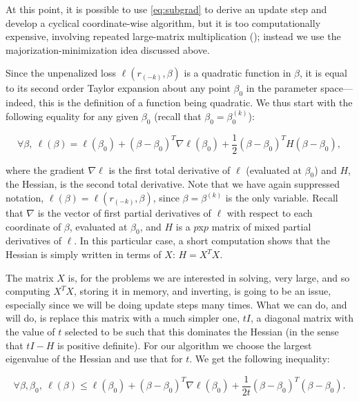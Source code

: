 \documentclass[12pt]{article}
\begin{document}
At this point, it is possible to use \autoref{eq:subgrad} to derive an update step and develop a cyclical coordinate-wise algorithm, but it is too computationally expensive, involving repeated large-matrix multiplication (\citep{simon2013sparse}); instead we use the majorization-minimization idea discussed above.

Since the unpenalized loss $\ell (r_{(-k)}, \beta)$ is a quadratic function in $\beta$, it is equal to its second order Taylor expansion about any point $\beta_0$ in the parameter space---indeed, this is the definition of a function being quadratic. We thus start with the following equality for any given $\beta_0$ (recall that $\beta_0 = \beta_0^{(k)}$):  

\begin{equation}
\forall \beta,\ \ell(\beta) = \ell(\beta_0)+(\beta - \beta_0)^T\nabla \ell(\beta_0)+\frac{1}{2}(\beta - \beta_0)^T H (\beta - \beta_0),
\label{eq:TaylorExp}
\end{equation}

where the gradient $\nabla \ell$ is the first total derivative of $\ell$ (evaluated at $\beta_0$) and $H$, the Hessian, is the second total derivative. Note that we have again suppressed notation, $\ell(\beta) = \ell(r_{(-k)},\beta)$, since $\beta = \beta^{(k)}$ is the only variable. Recall that $\nabla$ is the vector of first partial derivatives of $\ell$ with respect to each coordinate of $\beta$, evaluated at $\beta_0$, and $H$ is a $p$x$p$ matrix of mixed partial derivatives of $\ell$. In this particular case, a short computation shows that the Hessian is simply written in terms of $X$: $H = X^TX$.

The matrix $X$ is, for the problems we are interested in solving, very large, and so computing $X^TX$, storing it in memory, and inverting, is going to be an issue, especially since we will be doing update steps many times. What we can do, and will do, is replace this matrix with a much simpler one, $tI$, a diagonal matrix with the value of $t$ selected to be such that this dominates the Hessian (in the sense that $tI - H$ is positive definite). For our algorithm we choose the largest eigenvalue of the Hessian and use that for $t$. We get the following inequality:



\begin{equation}
\forall \beta,\beta_0,\ \ell(\beta) \leq \ell(\beta_0)+(\beta - \beta_0)^T\nabla \ell(\beta_0)+\frac{1}{2t}(\beta - \beta_0)^T  (\beta - \beta_0).
\label{eq:dominate}
\end{equation}
\end{document}
